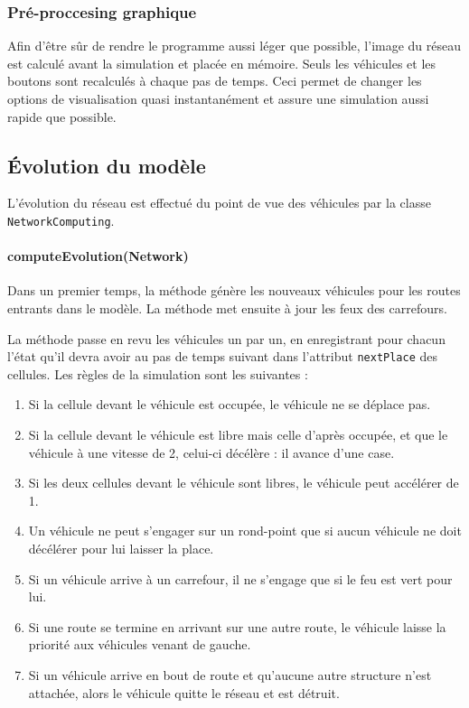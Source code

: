 \documentclass[a4paper,11pt, titlepage]{extarticle}
\begin{document}
\subsubsection{Pré-proccesing graphique}

Afin d'être sûr de rendre le programme aussi léger que possible, l'image du réseau est calculé avant la simulation et placée en mémoire. Seuls les véhicules et les boutons sont recalculés à chaque pas de temps. Ceci permet de changer les options de visualisation quasi instantanément et assure une simulation aussi rapide que possible.

\subsection{Évolution du modèle}

L'évolution du réseau est effectué du point de vue des véhicules par la classe \texttt{NetworkComputing}.

\paragraph{computeEvolution(Network)}

Dans un premier temps, la méthode génère les nouveaux véhicules pour les routes entrants dans le modèle. La méthode met ensuite à jour les feux des carrefours.

La méthode passe en revu les véhicules un par un, en enregistrant pour chacun l'état qu'il devra avoir au pas de temps suivant dans l'attribut \texttt{nextPlace} des cellules. Les règles de la simulation sont les suivantes :

\begin{enumerate}
\item Si la cellule devant le véhicule est occupée, le véhicule ne se déplace pas.
\item Si la cellule devant le véhicule est libre mais celle d'après occupée, et que le véhicule à une vitesse de 2, celui-ci décélère : il avance d'une case.
\item Si les deux cellules devant le véhicule sont libres, le véhicule peut accélérer de 1.
\item Un véhicule ne peut s'engager sur un rond-point que si aucun véhicule ne doit décélérer pour lui laisser la place.
\item Si un véhicule arrive à un carrefour, il ne s'engage que si le feu est vert pour lui.
\item Si une route se termine en arrivant sur une autre route, le véhicule laisse la priorité aux véhicules venant de gauche.
\item Si un véhicule arrive en bout de route et qu'aucune autre structure n'est attachée, alors le véhicule quitte le réseau et est détruit.
\end{enumerate}
\end{document}
